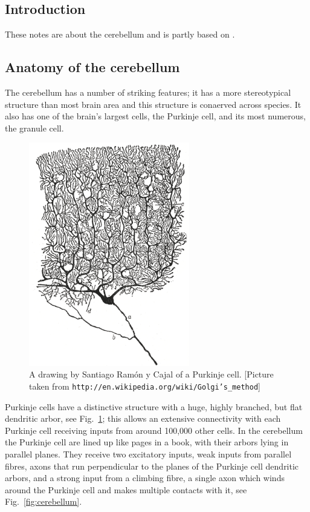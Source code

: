 \documentclass[11pt,a4paper]{scrartcl}
\begin{document}
\subsection*{Introduction}
These notes are about the cerebellum and is partly based on \cite{Albus1971a}.

\subsection*{Anatomy of the cerebellum}
The cerebellum has a number of striking features; it has a more
stereotypical structure than most brain area and this structure is
conaerved across species. It also has one of the brain's largest cells,
the Purkinje cell, and its most numerous, the granule cell.

\begin{figure}
\begin{center}
\includegraphics[width=7cm]{Purkinje_cell_by_Cajal.png}
\end{center}
\caption{A drawing by Santiago Ram\'{o}n y Cajal of a Purkinje cell. [Picture taken from \texttt{http://en.wikipedia.org/wiki/Golgi's\_method}]\label{fig:PC}}
\end{figure}

Purkinje cells have a distinctive structure with a huge, highly
branched, but flat dendritic arbor, see Fig.~\ref{fig:PC}; this allows
an extensive connectivity with each Purkinje cell receiving inputs
from around 100,000 other cells. In the cerebellum the Purkinje cell
are lined up like pages in a book, with their arbors lying in parallel
planes. They receive two excitatory inputs, weak inputs from parallel
fibres, axons that run perpendicular to the planes of the Purkinje
cell dendritic arbors, and a strong input from a climbing fibre, a
single axon which winds around the Purkinje cell and makes multiple
contacts with it, see Fig.~\ref{fig:cerebellum}.
\end{document}
